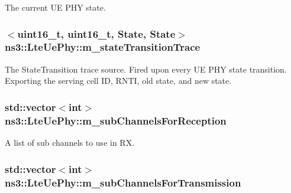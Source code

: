 The current UE P\+HY state. 

\subsubsection[{\texorpdfstring{m\+\_\+state\+Transition\+Trace}{m_stateTransitionTrace}}]{$<$uint16\+\_\+t, uint16\+\_\+t, {\bf State}, {\bf State}$>$ ns3\+::\+Lte\+Ue\+Phy\+::m\+\_\+state\+Transition\+Trace\hspace{0.3cm}{\ttfamily [private]}}\hypertarget{classns3_1_1LteUePhy_ab86ca96c3346a3d9143e03faf4093f13}{}\label{classns3_1_1LteUePhy_ab86ca96c3346a3d9143e03faf4093f13}
The {\ttfamily State\+Transition} trace source. Fired upon every UE P\+HY state transition. Exporting the serving cell ID, R\+N\+TI, old state, and new state. 
\subsubsection[{\texorpdfstring{m\+\_\+sub\+Channels\+For\+Reception}{m_subChannelsForReception}}]{\setlength{\rightskip}{0pt plus 5cm}std\+::vector$<$int$>$ ns3\+::\+Lte\+Ue\+Phy\+::m\+\_\+sub\+Channels\+For\+Reception\hspace{0.3cm}{\ttfamily [private]}}\hypertarget{classns3_1_1LteUePhy_ac59bd01d30fa909ba2ab0ee99ec163c5}{}\label{classns3_1_1LteUePhy_ac59bd01d30fa909ba2ab0ee99ec163c5}


A list of sub channels to use in RX. 

\subsubsection[{\texorpdfstring{m\+\_\+sub\+Channels\+For\+Transmission}{m_subChannelsForTransmission}}]{\setlength{\rightskip}{0pt plus 5cm}std\+::vector$<$int$>$ ns3\+::\+Lte\+Ue\+Phy\+::m\+\_\+sub\+Channels\+For\+Transmission\hspace{0.3cm}{\ttfamily [private]}}\hypertarget{classns3_1_1LteUePhy_ae057eff28e40e2eff2b57d0cb8b03596}{}\label{classns3_1_1LteUePhy_ae057eff28e40e2eff2b57d0cb8b03596}


